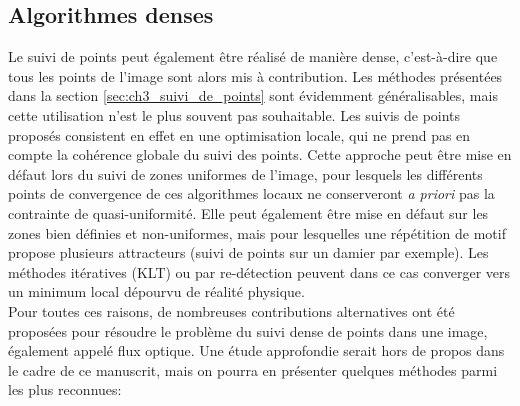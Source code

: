 \subsection{Algorithmes denses}\label{sec:ch3_Flux_optique_dense}
Le suivi de points peut également être réalisé de manière dense, c'est-à-dire que tous les points de l'image sont alors mis à contribution. Les méthodes présentées dans la section \ref{sec:ch3_suivi_de_points} sont évidemment généralisables, mais cette utilisation n'est le plus souvent pas souhaitable. Les suivis de points proposés consistent en effet en une optimisation locale, qui ne prend pas en compte la cohérence globale du suivi des points. Cette approche peut être mise en défaut lors du suivi de zones uniformes de l'image, pour lesquels les différents points de convergence de ces algorithmes locaux ne conserveront \textit{a priori} pas la contrainte de quasi-uniformité. Elle peut également être mise en défaut sur les zones bien définies et non-uniformes, mais pour lesquelles une répétition de motif propose plusieurs \og attracteurs\fg{} (suivi de points sur un damier par exemple). Les méthodes itératives (KLT) ou par re-détection peuvent dans ce cas converger vers un minimum local dépourvu de réalité physique. \\
Pour toutes ces raisons, de nombreuses contributions alternatives ont été proposées pour résoudre le problème du suivi dense de points dans une image, également appelé flux optique. Une étude approfondie serait hors de propos dans le cadre de ce manuscrit, mais on pourra en présenter quelques méthodes parmi les plus reconnues:

